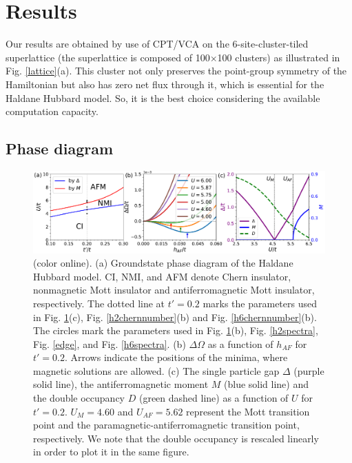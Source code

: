 \documentclass[12pt]{iopart}
\begin{document}
\section{Results}\label{R}

\par Our results are obtained by use of CPT/VCA on the 6-site-cluster-tiled superlattice (the superlattice is composed of 100$\times$100 clusters) as illustrated in Fig. \ref{lattice}(a). This cluster not only preserves the point-group symmetry of the Hamiltonian but also has zero net flux through it, which is essential for the Haldane Hubbard model. So, it is the best choice considering the available computation capacity.

\subsection{Phase diagram}

\begin{figure}
\centering
\includegraphics[scale=0.45]{phase}
\caption{(color online). (a) Groundstate phase diagram of the Haldane Hubbard model. CI, NMI, and AFM denote Chern insulator, nonmagnetic Mott insulator and antiferromagnetic Mott insulator, respectively. The dotted line at $t'=0.2$ marks the parameters used in Fig. \ref{phase}(c), Fig. \ref{h2chernnumber}(b) and Fig. \ref{h6chernnumber}(b). The circles mark the parameters used in Fig. \ref{phase}(b), Fig. \ref{h2spectra}, Fig. \ref{edge}, and Fig. \ref{h6spectra}. (b) $\Delta\Omega$ as a function of $h_{AF}$ for $t'=0.2$. Arrows indicate the positions of the minima, where magnetic solutions are allowed. (c) The single particle gap $\Delta$ (purple solid line), the antiferromagnetic moment $M$ (blue solid line) and the double occupancy $D$ (green dashed line) as a function of $U$ for $t'=0.2$. $U_M=4.60$ and $U_{AF}=5.62$ represent the Mott transition point and the paramagnetic-antiferromagnetic transition point, respectively. We note that the double occupancy is rescaled linearly in order to plot it in the same figure.} \label{phase}
\end{figure}
\end{document}
